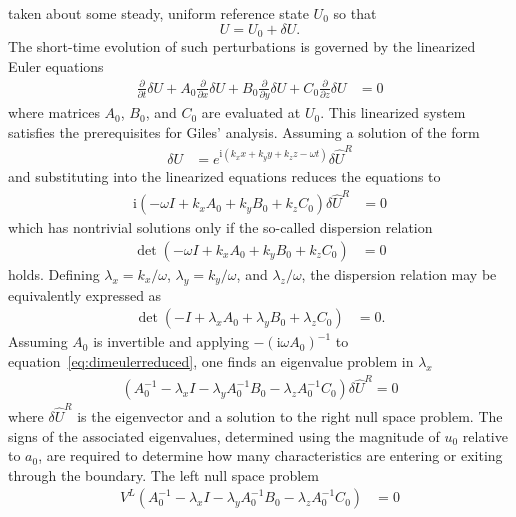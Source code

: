 \documentclass[letterpaper,11pt,nointlimits,reqno,draft]{amsart}
\newcommand{\ii}{\ensuremath{\mathrm{i}}}
\begin{document}
taken about some steady,
uniform reference state $U_0$ so that
$$
U = U_0 + \delta{}U.
$$
The short-time evolution of such perturbations is governed by the linearized
Euler equations
\begin{align}
\label{eq:dimeulerperturb}
      \frac{\partial}{\partial{}t}\delta{}U
+ A_0 \frac{\partial}{\partial{}x}\delta{}U
+ B_0 \frac{\partial}{\partial{}y}\delta{}U
+ C_0 \frac{\partial}{\partial{}z}\delta{}U
&= 0
\end{align}
where matrices $A_0$, $B_0$, and $C_0$ are evaluated at $U_0$.  This
linearized system satisfies the prerequisites for Giles' analysis.
Assuming a solution of the form
\begin{align}
  \delta{}U &= e^{\ii\left(
    k_x x + k_y y + k_z z - \omega t
  \right)}
  \delta\hat{U}^R
\end{align}
and substituting into the linearized equations reduces the equations to
\begin{align}
\label{eq:dimeulerreduced}
  \ii\left( - \omega I + k_x A_0 + k_y B_0 + k_z C_0 \right)
  \delta\hat{U}^R &= 0
\end{align}
which has nontrivial solutions only if the so-called dispersion relation
\begin{align}
  \det \left( - \omega I + k_x A_0 + k_y B_0 + k_z C_0 \right) &= 0
\end{align}
holds.  Defining $\lambda_x = k_x/\omega$, $\lambda_y = k_y/\omega$, and
$\lambda_z/\omega$, the dispersion relation may be equivalently expressed as
\begin{align}
\label{eq:dimeulerdisp}
  \det \left( - I + \lambda_x A_0 + \lambda_y B_0 + \lambda_z C_0 \right) &= 0
  .
\end{align}
Assuming $A_0$ is invertible and applying $- \left(\ii\omega{}A_0\right)^{-1}$
to equation~\eqref{eq:dimeulerreduced}, one finds an eigenvalue problem in
$\lambda_x$
\begin{align}
  \left(   A_0^{-1}
         - \lambda_x I
         - \lambda_y A_0^{-1} B_0
         - \lambda_z A_0^{-1} C_0
  \right) \delta\hat{U}^R = 0
\end{align}
where $\delta\hat{U}^R$ is the eigenvector and a solution to the right null
space problem.  The signs of the associated eigenvalues, determined using
the magnitude of $u_0$ relative to $a_0$, are required to determine how many
characteristics are entering or exiting through the boundary.  The left null
space problem
\begin{align}
\label{eq:dimeulereigenprob}
  V^{L}
  \left(   A_0^{-1}
         - \lambda_x I
         - \lambda_y A_0^{-1} B_0
         - \lambda_z A_0^{-1} C_0
  \right) &= 0
\end{align}
\end{document}
